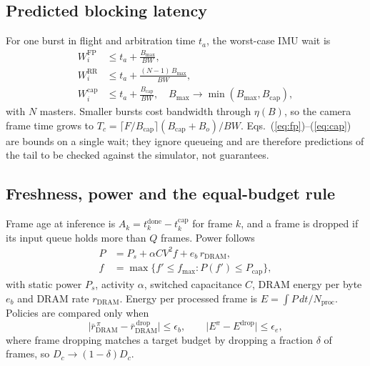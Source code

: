\documentclass[conference]{IEEEtran}
\begin{document}
\subsection{Predicted blocking latency}
For one burst in flight and arbitration time $t_a$, the worst-case IMU wait is
\begin{align}
W^{\mathrm{FP}}_{i}&\le t_a+\frac{B_{\max}}{BW},\label{eq:fp}\\
W^{\mathrm{RR}}_{i}&\le t_a+\frac{(N-1)\,B_{\max}}{BW},\label{eq:rr}\\
W^{\mathrm{cap}}_{i}&\le t_a+\frac{B_{\mathrm{cap}}}{BW},\quad B_{\max}\rightarrow\min(B_{\max},B_{\mathrm{cap}}),\label{eq:cap}
\end{align}
with $N$ masters. Smaller bursts cost bandwidth through $\eta(B)$, so the camera frame time grows to $T_c=\lceil F/B_{\mathrm{cap}}\rceil (B_{\mathrm{cap}}+B_o)/BW$. Eqs.~(\ref{eq:fp})--(\ref{eq:cap}) are bounds on a single wait; they ignore queueing and are therefore predictions of the tail to be checked against the simulator, not guarantees.

\subsection{Freshness, power and the equal-budget rule}
Frame age at inference is $A_k=t^{\mathrm{done}}_k-t^{\mathrm{cap}}_k$ for frame $k$, and a frame is dropped if its input queue holds more than $Q$ frames. Power follows
\begin{align}
P&=P_s+\alpha C V^2 f+e_b\,r_{\mathrm{DRAM}},\label{eq:power}\\
f&=\max\{f'\le f_{\max}: P(f')\le P_{\mathrm{cap}}\},\label{eq:dvfs}
\end{align}
with static power $P_s$, activity $\alpha$, switched capacitance $C$, DRAM energy per byte $e_b$ and DRAM rate $r_{\mathrm{DRAM}}$. Energy per processed frame is $E=\int P\,dt/N_{\mathrm{proc}}$. Policies are compared only when
\begin{equation}
\Big|\bar r_{\mathrm{DRAM}}^{\,\pi}-\bar r_{\mathrm{DRAM}}^{\,\mathrm{drop}}\Big|\le\epsilon_{b},\qquad \Big|E^{\pi}-E^{\mathrm{drop}}\Big|\le\epsilon_{e},
\label{eq:equal}
\end{equation}
where frame dropping matches a target budget by dropping a fraction $\delta$ of frames, so $D_c\rightarrow(1-\delta)D_c$.
\end{document}
